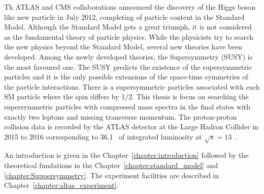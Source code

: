Th ATLAS and CMS collaborations announced the discovery of the Higgs boson like new particle in July 2012, completing of particle content in the Standard Model.
Although the Standard Model gets a great triumph, it is not considered as the fundamental theory of particle physics.
While the physicists try to search the new physics beyond the Standard Model, several new theories have been developed.
Among the newly developed theories, the Supersymmetry (SUSY) is the most favoured one.
The SUSY predicts the existence of the supersymmetric particles and it is the only possible extensions of the space-time symmetries of the particle interactions.
There is a supersymmetric particles associated with each SM particle where the spin differs by 1/2.
This thesis is focus on searching the supersymmetric particles with compressed mass spectra in the final states with exactly two leptons and missing transverse momentum.
The proton-proton collision data is recorded by the ATLAS detector at the Large Hadron Collider in 2015 to 2016 corresponding to 36.1~{\ifb} of integrated luminosity at $\sqrt{s} = 13$~{\TeV}.

An introduction is given in the Chapter~\ref{chapter:introduction} followed by the theoretical fundations in the Chapter~\ref{chapter:standard_model} and \ref{chapter:Suppersymmetry}. The experiment facilities are described in Chapter~\ref{chapter:altas_experiment}.
